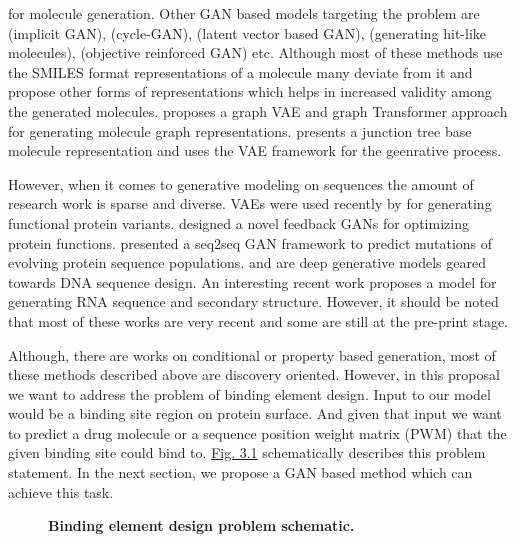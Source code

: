 for molecule generation. Other GAN based models
targeting the problem are \citep{de2018molgan} (implicit GAN), \citep{maziarka2020mol} (cycle-GAN), \citet{prykhodko2019novo} (latent vector based GAN), 
\citet{mendez2020novo} (generating hit-like molecules), \citet{guimaraes2017objective} (objective
reinforced GAN) etc. Although most of these methods use the SMILES format representations of a
molecule many deviate from it and propose other forms of representations which helps in increased
validity among the generated molecules. \citet{mitton2021graph} proposes a graph VAE and graph
Transformer \citep{vaswani2017attention} approach for generating molecule graph representations.
\citet{jin2018junction} presents a junction tree base molecule representation and uses the VAE
framework for the geenrative process.
\par
However, when it comes to generative modeling on sequences the amount of research work is sparse and
diverse. VAEs were used recently by \citet{hawkins2021generating} for generating functional protein
variants. \citet{gupta2018feedback} designed a novel feedback GANs for optimizing protein functions.
\citet{berman2020mutagan} presented a seq2seq GAN framework to predict mutations of evolving protein
sequence populations. \citet{linder2020generative} and \citet{killoran2017generating} are deep
generative models geared towards DNA sequence design. An interesting recent work
\citet{yan2021neural} proposes a model for generating RNA sequence and secondary structure. However,
it should be noted that most of these works are very recent and some are still at the pre-print
stage. 
\par
Although, there are works on conditional or property based generation, most of these methods
described above are discovery oriented. However, in this proposal we want to address the problem of
binding element design. Input to our model would be a binding site region on protein surface. And
given that input we want to predict a drug molecule or a sequence position weight matrix (PWM) that
the given binding site could bind to. \hyperref[fig:design_problem]{Fig. 3.1} schematically
describes this problem statement. In the next section, we propose a GAN based method which can
achieve this task.
\begin{center}\begin{figure}
        \caption[Binding element design problem schematic]{\textbf{Binding element design problem
        schematic.}}
        \label{fig:design_problem} \end{figure} \end{center}

